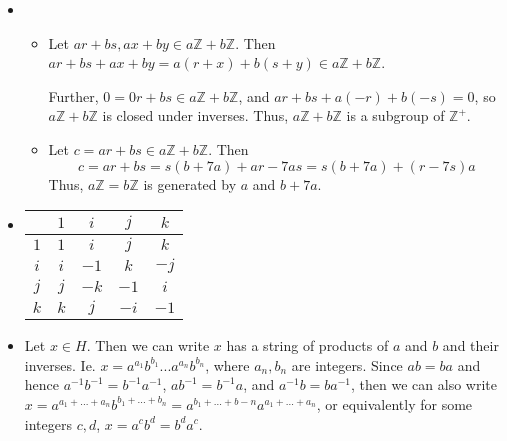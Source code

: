 \begin{itemize}
\begin{itemize}
$$\begin{bmatrix}
& 1
\end{bmatrix} \right\rbrace, \left\lbrace \begin{bmatrix}
\pm 1 & \\
& \pm 1
\end{bmatrix} \right\rbrace, \left\lbrace \begin{bmatrix}
1 & \\
& 1
\end{bmatrix}, \begin{bmatrix}
-1 & \\
& -1
\end{bmatrix} \right\rbrace$$
$$\left\lbrace \begin{bmatrix}
\pm 1 & \\
& 1
\end{bmatrix} \right\rbrace, \left\lbrace \begin{bmatrix}
1 & \\
& \pm 1
\end{bmatrix} \right\rbrace$$
\end{itemize}
\item[(7)]
\begin{itemize}
\item[(a)]
Let $ar + bs, ax + by \in a\mathbb{Z} + b\mathbb{Z}$. Then $ar + bs + ax + by = a(r + x) + b(s + y) \in a\mathbb{Z} + b\mathbb{Z}$.

Further, $0 = 0r + bs \in a\mathbb{Z} + b\mathbb{Z}$, and $ar + bs + a(-r) + b(-s) = 0$, so $a\mathbb{Z} + b\mathbb{Z}$ is closed under inverses. Thus, $a\mathbb{Z} + b\mathbb{Z}$ is a subgroup of $\mathbb{Z}^+$.
\item[(b)]
Let $c = ar + bs \in a\mathbb{Z} + b\mathbb{Z}$. Then 
$$c = ar + bs = s(b + 7a) + ar - 7as = s(b + 7a) + (r - 7s)a$$
Thus, $a\mathbb{Z} = b\mathbb{Z}$ is generated by $a$ and $b + 7a$.
\end{itemize}
\item[(8)]
\begin{tabular}{|c||c|c|c|c|}
\hline
& $1$ & $i$ & $j$ & $k$ \\
\hline
\hline
$1$ & $1$ & $i$ & $j$ & $k$ \\
\hline
$i$ & $i$ & $-1$ & $k$ & $-j$ \\
\hline
$j$ & $j$ & $-k$ & $-1$ & $i$ \\
\hline
$k$ & $k$ & $j$ & $-i$ & $-1$ \\
\hline
\end{tabular}
\item[(9)]
Let $x \in H$. Then we can write $x$ has a string of products of $a$ and $b$ and their inverses. Ie. $x = a^{a_1}b^{b_1}...a^{a_n}b^{b_n}$, where $a_n, b_n$ are integers. Since $ab = ba$ and hence $a^{-1}b^{-1} = b^{-1}a^{-1}$, $ab^{-1} = b^{-1}a$, and $a^{-1}b = ba^{-1}$, then we can also write $x = a^{a_1+...+a_n}b^{b_1+...+b_n} = a^{b_1 + ... + b-n}a^{a_1+...+a_n}$, or equivalently for some integers $c, d$, $x = a^cb^d = b^da^c$. 


\end{itemize}
